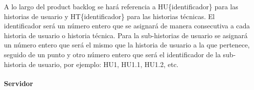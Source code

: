 A lo largo del product backlog  se hará referencia a HU\{identificador\} para las historias de usuario y HT\{identificador\} para las historias técnicas. El identificador será un número entero que se asignará de manera consecutiva a cada historia de usuario o historia técnica. Para la sub-historias de usuario se asignará un número entero que será el mismo que la historia de usuario a la que pertenece, seguido de un punto y otro número entero que será el identificador de la sub-historia de usuario, por ejemplo: HU1, HU1.1, HU1.2, etc.

\paragraph{Servidor}
\renewcommand{\arraystretch}{1.3} %

